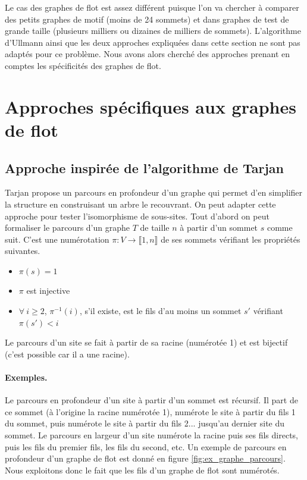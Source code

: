 Le cas des graphes de flot est assez différent puisque l'on va chercher à comparer des petits graphes de motif (moins de 24 sommets) et dans graphes de test de grande taille (plusieurs milliers ou dizaines de milliers de sommets).
L'algorithme d'Ullmann ainsi que les deux approches expliquées dans cette section ne sont pas adaptés pour ce problème. Nous avons alors cherché des approches prenant en comptes les spécificités des graphes de flot.

\section{Approches spécifiques aux graphes de flot}
\subsection{Approche inspirée de l'algorithme de Tarjan}
Tarjan \cite{Tar71} propose un parcours en profondeur d'un graphe qui permet d'en simplifier la structure en construisant un arbre le recouvrant. 
On peut adapter cette approche pour tester l'isomorphisme de sous-sites. 
Tout d'abord on peut formaliser le parcours d'un graphe $T$ de taille $n$ à partir d'un sommet $s$ comme suit.
C'est une numérotation $\pi:V\rightarrow \llbracket 1, n \rrbracket$ de ses sommets vérifiant les propriétés suivantes.
\begin{itemize}
 \item $\pi(s)=1$
 \item $\pi$ est injective
 \item $\forall\ i\geq 2$, $\pi^{-1}(i)$, s'il existe, est le fils d'au moins un sommet $s'$ vérifiant $\pi(s')<i$
\end{itemize}

Le parcours d'un site se fait à partir de sa racine (numérotée 1) et est bijectif (c'est possible car il a une racine).


\paragraph{Exemples.}
Le parcours en profondeur d'un site à partir d'un sommet est récursif. Il part de ce sommet (à l'origine la racine numérotée 1), numérote le site à partir du fils 1 du sommet, puis numérote le site à partir du fils 2... jusqu'au dernier site du sommet.
Le parcours en largeur d'un site numérote la racine puis ses fils directs, puis les fils du premier fils, les fils du second, etc.
Un exemple de parcours en profondeur d'un graphe de flot est donné en figure \ref{fig:ex_graphe_parcours}.
Nous exploitons donc le fait que les fils d'un graphe de flot sont numérotés.

